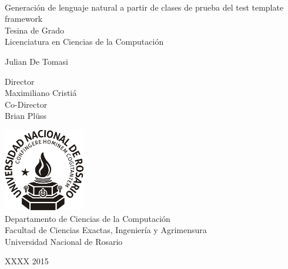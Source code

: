 \documentclass[spanish,11pt,a4paper]{memoir} %
\begin{document}
 

%
%
\thispagestyle{empty}

{%
\sffamily
\centering
\Large

~\vspace{\fill}

{\huge 
Generación de lenguaje natural a partir de clases de prueba del test template framework
}\\[0.6em]
Tesina de Grado\\
Licenciatura en Ciencias de la Computación

\vspace{1.5cm}

{\LARGE
Julian De Tomasi
}

\vspace{1.5cm}

{\tiny Director}\\
Maximiliano Cristiá\\
{\tiny Co-Director}\\
Brian Plüss\\

\vspace{2.5cm}

\includegraphics[scale=0.8]{img/unr.png}\\
Departamento de Ciencias de la Computación\\
Facultad de Ciencias Exactas, Ingeniería y Agrimensura\\
Universidad Nacional de Rosario

\vspace{\fill}

XXXX 2015

}%

\cleardoublepage


\tableofcontents*


















\end{document}
